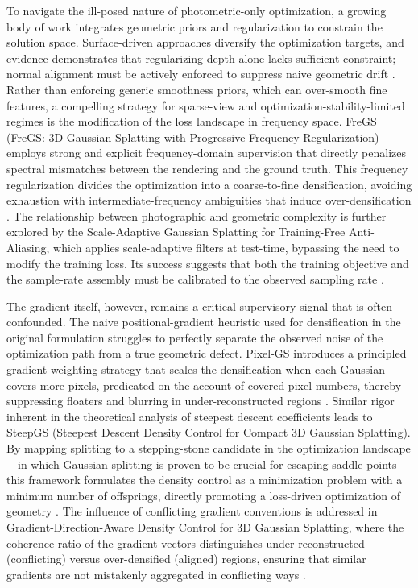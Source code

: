 \documentclass[11pt,a4paper]{article}
\begin{document}
To navigate the ill-posed nature of photometric-only optimization, a growing body of work integrates geometric priors and regularization to constrain the solution space. Surface-driven approaches diversify the optimization targets, and evidence demonstrates that regularizing depth alone lacks sufficient constraint; normal alignment must be actively enforced to suppress naive geometric drift \cite{arxiv:2501.08174v2,arxiv:2510.08566v1}. Rather than enforcing generic smoothness priors, which can over-smooth fine features, a compelling strategy for sparse-view and optimization-stability-limited regimes is the modification of the loss landscape in frequency space. FreGS (FreGS: 3D Gaussian Splatting with Progressive Frequency Regularization) employs strong and explicit frequency-domain supervision that directly penalizes spectral mismatches between the rendering and the ground truth. This frequency regularization divides the optimization into a coarse-to-fine densification, avoiding exhaustion with intermediate-frequency ambiguities that induce over-densification \cite{arxiv:2403.06908v2,arxiv:2503.07000v1}. The relationship between photographic and geometric complexity is further explored by the Scale-Adaptive Gaussian Splatting for Training-Free Anti-Aliasing, which applies scale-adaptive filters at test-time, bypassing the need to modify the training loss. Its success suggests that both the training objective and the sample-rate assembly must be calibrated to the observed sampling rate \cite{arxiv:2403.19615v1,arxiv:2311.16493v1}.

The gradient itself, however, remains a critical supervisory signal that is often confounded. The naive positional-gradient heuristic used for densification in the original formulation struggles to perfectly separate the observed noise of the optimization path from a true geometric defect. Pixel-GS introduces a principled gradient weighting strategy that scales the densification when each Gaussian covers more pixels, predicated on the account of covered pixel numbers, thereby suppressing floaters and blurring in under-reconstructed regions \cite{arxiv:2403.15530v1}. Similar rigor inherent in the theoretical analysis of steepest descent coefficients leads to SteepGS (Steepest Descent Density Control for Compact 3D Gaussian Splatting). By mapping splitting to a stepping-stone candidate in the optimization landscape---in which Gaussian splitting is proven to be crucial for escaping saddle points---this framework formulates the density control as a minimization problem with a minimum number of offsprings, directly promoting a loss-driven optimization of geometry \cite{arxiv:2505.05587v1}. The influence of conflicting gradient conventions is addressed in Gradient-Direction-Aware Density Control for 3D Gaussian Splatting, where the coherence ratio of the gradient vectors distinguishes under-reconstructed (conflicting) versus over-densified (aligned) regions, ensuring that similar gradients are not mistakenly aggregated in conflicting ways \cite{arxiv:2508.09239v2}.
\end{document}
